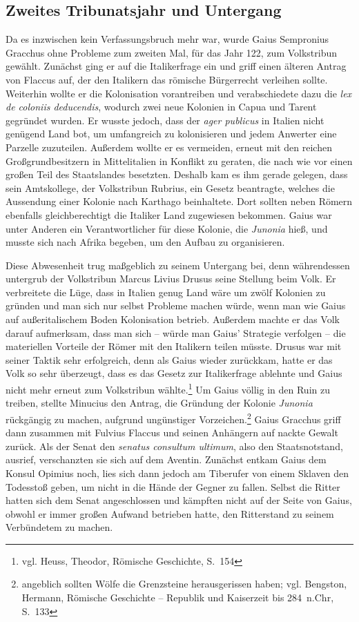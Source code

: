 \documentclass[
    12pt,
    smallheadings,
    ]{scrreprt}
\begin{document}
        \subsection{Zweites Tribunatsjahr und Untergang}
Da es inzwischen kein Verfassungsbruch mehr war, wurde Gaius Sempronius Gracchus ohne Probleme zum zweiten Mal, für das Jahr 122, zum Volkstribun gewählt.
Zunächst ging er auf die Italikerfrage ein und griff einen älteren Antrag von Flaccus auf, der den Italikern das römische Bürgerrecht verleihen sollte.
Weiterhin wollte er die Kolonisation vorantreiben und verabschiedete dazu die \textit{lex de coloniis deducendis}, wodurch zwei neue Kolonien in Capua und Tarent gegründet wurden.
Er wusste jedoch, dass der \textit{ager publicus} in Italien nicht genügend Land bot, um umfangreich zu kolonisieren und jedem Anwerter eine Parzelle zuzuteilen.
Außerdem wollte er es vermeiden, erneut mit den reichen Großgrundbesitzern in Mittelitalien in Konflikt zu geraten, die nach wie vor einen großen Teil des Staatslandes besetzten.
Deshalb kam es ihm gerade gelegen, dass sein Amtskollege, der Volkstribun Rubrius, ein Gesetz beantragte, welches die Aussendung einer Kolonie nach Karthago beinhaltete.
Dort sollten neben Römern ebenfalls gleichberechtigt die Italiker Land zugewiesen bekommen.
Gaius war unter Anderen ein Verantwortlicher für diese Kolonie, die \textit{Junonia} hieß, und musste sich nach Afrika begeben, um den Aufbau zu organisieren.

Diese Abwesenheit trug maßgeblich zu seinem Untergang bei, denn währendessen untergrub der Volkstribun Marcus Livius Drusus seine Stellung beim Volk.
Er verbreitete die Lüge, dass in Italien genug Land wäre um zwölf Kolonien zu gründen und man sich nur selbst Probleme machen würde, wenn man wie Gaius auf außeritalischem Boden Kolonisation betrieb.
Außerdem machte er das Volk darauf aufmerksam, dass man sich -- würde man Gaius' Strategie verfolgen -- die materiellen Vorteile der Römer mit den Italikern teilen müsste.
Drusus war mit seiner Taktik sehr erfolgreich, denn als Gaius wieder zurückkam, hatte er das Volk so sehr überzeugt, dass es das Gesetz zur Italikerfrage ablehnte und Gaius nicht mehr erneut zum Volkstribun wählte.\footnote{vgl. Heuss, Theodor, Römische Geschichte, S.~154}
Um Gaius völlig in den Ruin zu treiben, stellte Minucius den Antrag, die Gründung der Kolonie \textit{Junonia} rückgängig zu machen, aufgrund ungünstiger Vorzeichen.\footnote{angeblich sollten Wölfe die Grenzsteine herausgerissen haben; vgl. Bengston, Hermann, Römische Geschichte -- Republik und Kaiserzeit bis 284~n.Chr, S.~133}
Gaius Gracchus griff dann zusammen mit Fulvius Flaccus und seinen Anhängern auf nackte Gewalt zurück.
Als der Senat den \textit{senatus consultum ultimum}, also den Staatsnotstand, ausrief, verschanzten sie sich auf dem Aventin.
Zunächst entkam Gaius dem Konsul Opimius noch, lies sich dann jedoch am Tiberufer von einem Sklaven den Todesstoß geben, um nicht in die Hände der Gegner zu fallen.
Selbst die Ritter hatten sich dem Senat angeschlossen und kämpften nicht auf der Seite von Gaius, obwohl er immer großen Aufwand betrieben hatte, den Ritterstand zu seinem Verbündetem zu machen.
\end{document}
